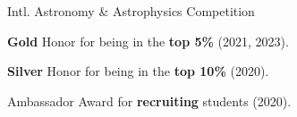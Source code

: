 \entryItem
	{Intl. Astronomy \& Astrophysics Competition}
	{}

	\begin{items}
		\item \textbf{Gold} Honor for being in the \textbf{top 5\%} (2021, 2023).
		\item \textbf{Silver} Honor for being in the \textbf{top 10\%} (2020).
		\item Ambassador Award for \textbf{recruiting} students (2020).
	\end{items}
